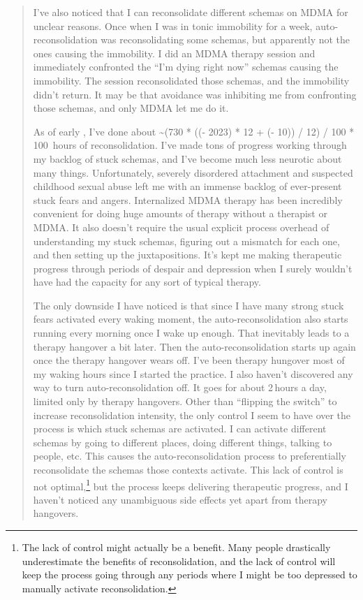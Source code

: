 \documentclass[11pt,oneside]{book}
\newcommand{\reconsolidationhours}{\the\numexpr (730 * ((\year - 2023) * 12 + (\month - 10)) / 12) / 100 * 100 \relax{}}
\begin{document}
\begin{quotation}
    I've also noticed that I can reconsolidate different schemas on MDMA for unclear reasons. Once when I was in tonic immobility for a week, auto-reconsolidation was reconsolidating some schemas, but apparently not the ones causing the immobility. I did an MDMA therapy session and immediately confronted the \enquote{I'm dying right now} schemas causing the immobility. The session reconsolidated those schemas, and the immobility didn't return. It may be that avoidance was inhibiting me from confronting those schemas, and only MDMA let me do it.

    As of early \the\year, I've done about \textasciitilde\reconsolidationhours{}\,hours of reconsolidation. I've made tons of progress working through my backlog of stuck schemas, and I've become much less neurotic about many things. Unfortunately, severely disordered attachment and suspected childhood sexual abuse left me with an immense backlog of ever-present stuck fears and angers. Internalized MDMA therapy has been incredibly convenient for doing huge amounts of therapy without a therapist or MDMA. It also doesn't require the usual explicit process overhead of understanding my stuck schemas, figuring out a mismatch for each one, and then setting up the juxtapositions. It's kept me making therapeutic progress through periods of despair and depression when I surely wouldn't have had the capacity for any sort of typical therapy.
    
    The only downside I have noticed is that since I have many strong stuck fears activated every waking moment, the auto-reconsolidation also starts running every morning once I wake up enough. That inevitably leads to a therapy hangover a bit later. Then the auto-reconsolidation starts up again once the therapy hangover wears off. I've been therapy hungover most of my waking hours since I started the practice. I also haven't discovered any way to turn auto-reconsolidation off. It goes for about 2\,hours a day, limited only by therapy hangovers. Other than \enquote{flipping the switch} to increase reconsolidation intensity, the only control I seem to have over the process is which stuck schemas are activated. I can activate different schemas by going to different places, doing different things, talking to people, etc. This causes the auto-reconsolidation process to preferentially reconsolidate the schemas those contexts activate. This lack of control is not optimal,\footnote{The lack of control might actually be a benefit. Many people drastically underestimate the benefits of reconsolidation, and the lack of control will keep the process going through any periods where I might be too depressed to manually activate reconsolidation.} but the process keeps delivering therapeutic progress, and I haven't noticed any unambiguous side effects yet apart from therapy hangovers.%
    

\end{quotation}
\end{document}
